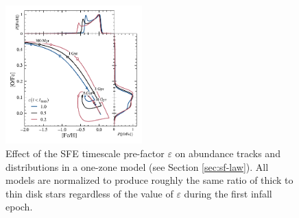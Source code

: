 \documentclass[twocolumn,twocolappendix,linenumbers]{aastex631}
\newcommand{\onecolumn}{0.47\textwidth}
\begin{document}
\begin{figure}
    \centering
    \includegraphics[width=\onecolumn]{src/tex/figures/sfe_prefactor.pdf}
    \caption{Effect of the SFE timescale pre-factor $\varepsilon$ on abundance tracks and distributions in a one-zone model (see Section \ref{sec:sf-law}). All models are normalized to produce roughly the same ratio of thick to thin disk stars regardless of the value of $\varepsilon$ during the first infall epoch.}
    \label{fig:sfe-prefactor}
\end{figure}
\end{document}
